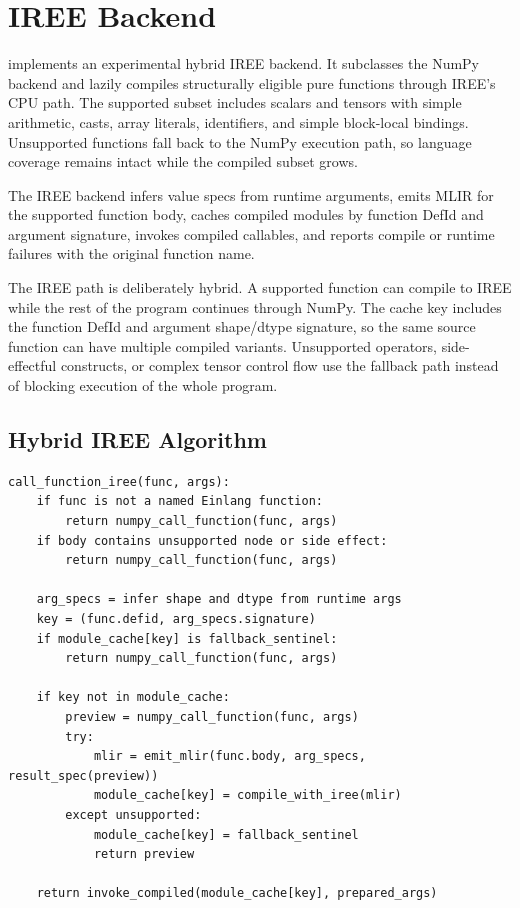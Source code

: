 \section{IREE Backend}

 implements an experimental hybrid IREE
backend. It subclasses the NumPy backend and lazily compiles structurally
eligible pure functions through IREE's CPU path. The supported subset includes
scalars and tensors with simple arithmetic, casts, array literals, identifiers,
and simple block-local bindings. Unsupported functions fall back to the NumPy
execution path, so language coverage remains intact while the compiled subset
grows.

The IREE backend infers value specs from runtime arguments, emits MLIR for the
supported function body, caches compiled modules by function DefId and argument
signature, invokes compiled callables, and reports compile or runtime failures
with the original function name.

The IREE path is deliberately hybrid. A supported function can compile to IREE
while the rest of the program continues through NumPy. The cache key includes
the function DefId and argument shape/dtype signature, so the same source
function can have multiple compiled variants. Unsupported operators,
side-effectful constructs, or complex tensor control flow use the fallback path
instead of blocking execution of the whole program.

\subsection{Hybrid IREE Algorithm}

\begin{lstlisting}[style=pythoncode,caption={Lazy IREE compilation with fallback.}]
call_function_iree(func, args):
    if func is not a named Einlang function:
        return numpy_call_function(func, args)
    if body contains unsupported node or side effect:
        return numpy_call_function(func, args)

    arg_specs = infer shape and dtype from runtime args
    key = (func.defid, arg_specs.signature)
    if module_cache[key] is fallback_sentinel:
        return numpy_call_function(func, args)

    if key not in module_cache:
        preview = numpy_call_function(func, args)
        try:
            mlir = emit_mlir(func.body, arg_specs, result_spec(preview))
            module_cache[key] = compile_with_iree(mlir)
        except unsupported:
            module_cache[key] = fallback_sentinel
            return preview

    return invoke_compiled(module_cache[key], prepared_args)
\end{lstlisting}

